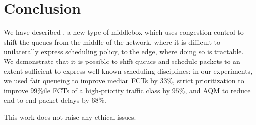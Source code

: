 \section{Conclusion}\label{s:concl}
We have described \name, a new type of middlebox which uses congestion control to shift the queues from the middle of the network, where it is difficult to unilaterally express scheduling policy, to the edge, where doing so is tractable.
We demonstrate that it is possible to shift queues and schedule packets to an extent sufficient to express well-known scheduling disciplines: in our experiments, we used fair queueing to improve median FCTs by 33\%, strict prioritization to improve $99$\%ile FCTs of a high-priority traffic class by $95$\%, and AQM to reduce end-to-end packet delays by $68$\%.

 This work does not raise any ethical issues.